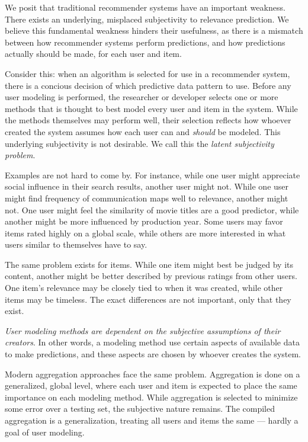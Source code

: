 We posit that traditional recommender systems have an important weakness.
There exists an underlying, misplaced subjectivity to relevance prediction.
We believe this fundamental weakness hinders their usefulness,
as there is a mismatch between how recommender systems perform predictions,
and how predictions actually should be made, for each user and item.



Consider this: 
when an algorithm is selected for use in a recommender system,
there is a concious decision of which predictive data pattern to use.
Before any user modeling is performed, the researcher or developer selects
one or more methods that is thought to best model every user and item in the system.
While the methods themselves may perform well, their selection
reflects how whoever created the system assumes how each user
can and \emph{should} be modeled. This underlying subjectivity is not desirable.
We call this the \emph{latent subjectivity problem}.

Examples are not hard to come by.
For instance, while one user might appreciate social
influence in their search results, another user might not.
While one user might find frequency of communication maps well to relevance,
another might not. 
One user might feel the similarity of movie titles are a good predictor,
while another might be more influenced by production year.
Some users may favor items rated highly on a global scale,
while others are more interested in what users similar to themselves have to say.

The same problem exists for items. While one item might best be judged by its content,
another might be better described by previous ratings from other users.
One item's relevance may be closely tied to when it was created,
while other items may be timeless.
The exact differences are not important, only that they exist.

\emph{User modeling methods are dependent on the subjective assumptions of their creators}.
In other words, a modeling method use certain aspects of available data to make predictions,
and these aspects are chosen by whoever creates the system.

Modern aggregation approaches face the same problem. 
Aggregation is done on a generalized, global level,
where each user and item is expected to place the same importance on each modeling method.
While aggregation is selected to minimize some error over a testing set,
the subjective nature remains. The compiled aggregation is a generalization,
treating all users and items the same --- hardly a goal of user modeling.

